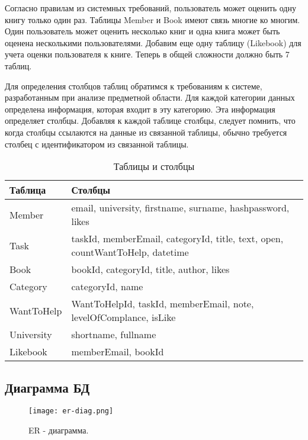 Согласно правилам из системных требований, пользователь может оценить одну книгу только один раз. Таблицы Member и Book имеют связь многие ко многим. Один пользователь может оценить несколько книг и одна книга может быть оценена несколькими пользователями. Добавим еще одну таблицу (Likebook) для учета оценки пользователя к книге. Теперь в общей сложности должно быть 7 таблиц. 

Для определения столбцов таблиц обратимся к требованиям к системе, разработанным при анализе предметной области. Для каждой категории данных определена информация, которая входит в эту категорию. Эта информация определяет столбцы. Добавляя к каждой таблице столбцы, следует помнить, что когда столбцы ссылаются на данные из связанной таблицы, обычно требуется столбец с идентификатором из связанной таблицы.

\begin{table}[h]
\caption{Таблицы и столбцы}
\medskip
\begin{tabular}{|l|p{12cm}|}
\hline
Таблица & Столбцы\\
\hline
Member & email, university, firstname, surname, hashpassword, likes\\
Task & taskId, memberEmail, categoryId, title, text, open, countWantToHelp, datetime\\
Book & bookId, categoryId, title, author, likes\\
Category & categoryId, name\\
WantToHelp & WantToHelpId, taskId, memberEmail, note, levelOfComplance, isLike\\
University & shortname, fullname\\
Likebook & memberEmail, bookId\\
\hline
\end{tabular}
\end{table}

\subsection{Диаграмма БД}
\begin{figure}[h]
  \centering
  \texttt{[image: er-diag.png]}
  \caption{ER - диаграмма.}
\end{figure}



% 
% 
